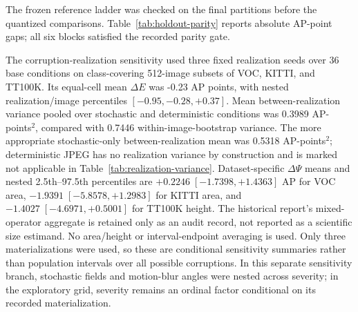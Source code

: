 \documentclass[10pt]{article}
\newcommand{\DeltaE}{\Delta E}
\newcommand{\DeltaPsi}{\Delta\Psi}
\begin{document}
The frozen reference ladder was checked on the final partitions before the
quantized comparisons. Table~\ref{tab:holdout-parity} reports absolute AP-point
gaps; all six blocks satisfied the recorded parity gate.

\begin{table}[htbp]
\centering
\caption{Selection-disjoint reference-ladder parity. Values are absolute
AP-point gaps between the named implementations.}
\label{tab:holdout-parity}
\small
\resizebox{0.9\textwidth}{!}{}
\end{table}
\FloatBarrier

The corruption-realization sensitivity used three fixed realization seeds over
36 base conditions on class-covering 512-image subsets of VOC, KITTI, and
TT100K. Its equal-cell mean $\DeltaE$ was -0.23 AP points, with nested
realization/image percentiles $[-0.95,-0.28,+0.37]$. Mean between-realization
variance pooled over stochastic and deterministic conditions was 0.3989
AP-points$^2$, compared with 0.7446 within-image-bootstrap variance. The more
appropriate stochastic-only between-realization mean was 0.5318
AP-points$^2$; deterministic JPEG has no realization variance by construction
and is marked not applicable in Table~\ref{tab:realization-variance}. Dataset-specific
$\DeltaPsi$ means and nested 2.5th--97.5th percentiles are
$+0.2246\;[-1.7398,+1.4363]$ AP for VOC area,
$-1.9391\;[-5.8578,+1.2983]$ for KITTI area, and
$-1.4027\;[-4.6971,+0.5001]$ for TT100K height. The historical report's
mixed-operator aggregate is retained only as an audit record, not reported as a
scientific size estimand. No area/height or interval-endpoint averaging is used.
Only three materializations were used, so these are
conditional sensitivity summaries rather than population intervals over all
possible corruptions. In this separate sensitivity branch, stochastic fields
and motion-blur angles were nested across severity; in the exploratory grid,
severity remains an ordinal factor conditional on its recorded materialization.

\begin{table}[htbp]
\centering
\caption{Realization-specific direct interactions. All-object $\Delta E$ uses
36 cells per label. Area $\DeltaPsi$ uses the 24 VOC/KITTI cells and height
$\DeltaPsi$ the 12 TT100K cells per label; the two operators are not pooled.
SD is the descriptive standard deviation across three fixed labels.}
\label{tab:realization-seeds}
\small
\resizebox{0.82\textwidth}{!}{}
\end{table}
\end{document}
